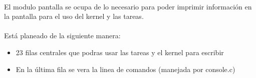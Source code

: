 \documentclass[11pt, a4paper]{article}
\begin{document}
\paragraph{}
El modulo pantalla se ocupa de lo necesario para poder imprimir información en la pantalla para el uso del kernel y las tareas.
\paragraph{}
Está planeado de la siguiente manera:
\begin{itemize}
\item 23 filas centrales que podras usar las tareas y el kernel para escribir
\item En la última fila se vera la linea de comandos (manejada por console.c) 

\end{itemize}


 
\end{document}

